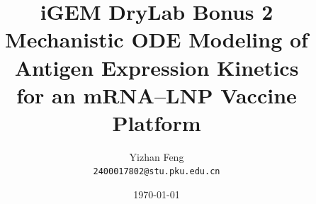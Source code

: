 \title{\textbf{iGEM DryLab Bonus 2} \\[0.5em]
    \Large Mechanistic ODE Modeling of Antigen Expression Kinetics \\
    for an mRNA–LNP Vaccine Platform}
\author{Yizhan Feng \\ 
    \normalsize{\texttt{2400017802@stu.pku.edu.cn}}}
\date{\today}